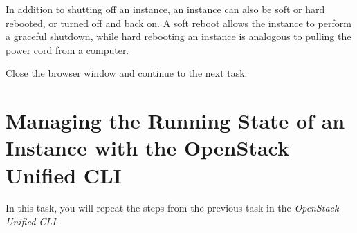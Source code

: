\documentclass[letterpaper, 12pt]{article}
\begin{document}
\begin{enumerate}
    \begin{tipbox}
        In addition to shutting off an instance, an instance can also be soft or hard rebooted, or turned off and back on.
        A soft reboot allows the instance to perform a graceful shutdown, while hard rebooting an instance is analogous to pulling the power cord from a computer.
    \end{tipbox}

    \begin{labstep}
        Close the browser window and continue to the next task.
    \end{labstep}

\end{enumerate}

\section{Managing the Running State of an Instance with the OpenStack Unified CLI}\label{sec:managing-the-power-state-of-an-instance-with-the-openstack-unified-cli}
In this task, you will repeat the steps from the previous task in the \textit{OpenStack Unified CLI}.
\end{document}
